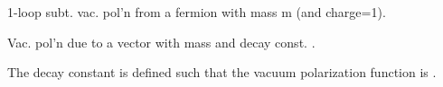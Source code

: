 \documentclass[letterpaper,10pt,english]{sphinxmanual}
\begin{document}
\begin{fulllineitems}

\begin{fulllineitems}
\label{g2tools:g2tools.vacpol.fermion}
1-loop subt. vac. pol'n from a fermion with mass m (and charge=1).

\end{fulllineitems}


\begin{fulllineitems}
\label{g2tools:g2tools.vacpol.vector}
Vac. pol'n due to a vector with mass  and decay const. .

The decay constant is defined such that the vacuum polarization
function is .

\end{fulllineitems}


\end{fulllineitems}

\end{document}

